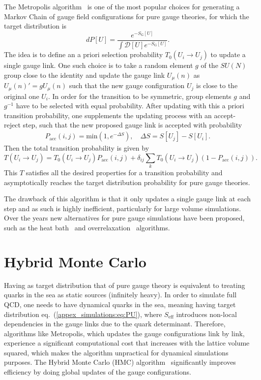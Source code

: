 The Metropolis algorithm~\citep{Metropolis:1953am} is one of the most popular choices for generating a Markov Chain of gauge field configurations for pure gauge theories, for which the target distribution is
\begin{equation}
dP[U]=\frac{e^{-S_{\textrm{G}}[U]}}{\int\mathcal{D}[U]e^{-S_{\textrm{G}}[U]}}.
\end{equation}
The idea is to define an a priori selection probability $T_0(U_i\rightarrow U_j)$ to update a single gauge link. One such choice is to take a random element $g$ of the $SU(N)$ group close to the identity and update the gauge link $U_{\mu}(n)$ as $U_{\mu}(n)'=gU_{\mu}(n)$ such that the new gauge configuration $U_j$ is close to the original one $U_i$. In order for the transition to be symmetric, group elements $g$ and $g^{-1}$ have to be selected with equal probability. After updating with this a priori transition probability, one supplements the updating process with an accept-reject step, such that the new proposed gauge link is accepted with probability
\begin{gather}
P_{\textrm{acc}}(i,j)=\textrm{min}\left(1,e^{-\Delta S}\right), \quad \Delta S=S[U_j]-S[U_i].
\end{gather}
Then the total transition probability is given by 
\begin{equation}
T(U_i\rightarrow U_j)=T_0(U_i\rightarrow U_j)P_{\textrm{acc}}(i,j)+\delta_{ij}\sum_kT_0(U_i\rightarrow U_j)(1-P_{\textrm{acc}}(i,j)).
\end{equation}
This $T$ satisfies all the desired properties for a transition probability and asymptotically reaches the target distribution probability for pure gauge theories.

The drawback of this algorithm is that it only updates a single gauge link at each step and as such is highly inefficient, particularly for large volume simulations. Over the years new alternatives for pure gauge simulations have been proposed, such as the heat bath~\citep{Creutz:1980zw} and overrelaxation~\citep{Adler:1981sn,Creutz:1987xi} algorithms.

\section{Hybrid Monte Carlo}

Having as target distribution that of pure gauge theory is equivalent to treating quarks in the sea as static sources (infinitely heavy). In order to simulate full QCD, one needs to have dynamical quarks in the sea, meaning having target distribution eq.~(\ref{appex_simulations:eq:PU}), where $S_{\textrm{eff}}$ introduces non-local dependencies in the gauge links due to the quark determinant. Therefore, algorithms like Metropolis, which updates the gauge configurations link by link, experience a significant computational cost that increases with the lattice volume squared, which makes the algorithm unpractical for dynamical simulations purposes. The Hybrid Monte Carlo (HMC) algorithm~\citep{Duane:1987de,Gottlieb:1987mq} significantly improves efficiency by doing global updates of the gauge configurations.

